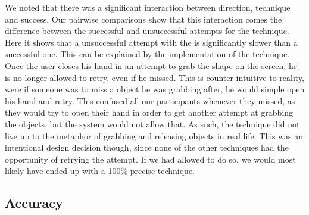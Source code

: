 We noted that there was a significant interaction between direction, technique and success.
Our pairwise comparisons show that this interaction comes the difference between the successful and unsuccessful attempts for the \grab \pull technique. 
Here it shows that a unsuccessful attempt with the \grab \pull is significantly slower than a successful one. 
This can be explained by the implementation of the technique. 
Once the user closes his hand in an attempt to grab the shape on the screen, he is no longer allowed to retry, even if he missed.
This is counter-intuitive to reality, were if someone was to miss a object he was grabbing after, he would simple open his hand and retry.
This confused all our participants whenever they missed, as they would try to open their hand in order to get another attempt at grabbing the objects, but the system would not allow that.
As such, the \grab \pull technique did not live up to the metaphor of grabbing and releasing objects in real life.
This was an intentional design decision though, since none of the other techniques had the opportunity  of retrying the attempt.
If we had allowed \grab \pull to do so, we would most likely have ended up with a 100\% precise technique. 

\subsection{Accuracy}


